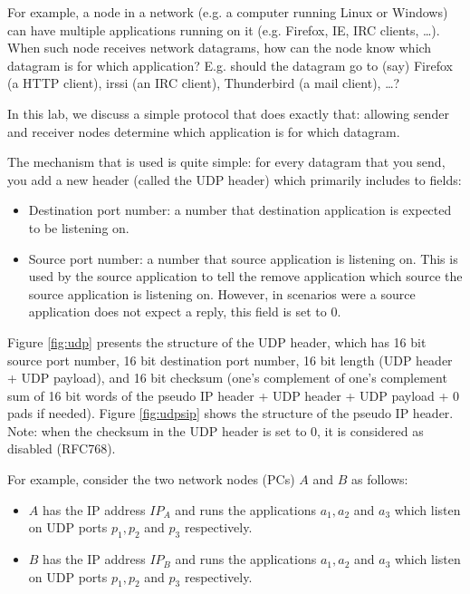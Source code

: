 \documentclass[pdftex,12pt,a4paper]{article}
\begin{document}
        For example, a node in a network (e.g. a computer running Linux or
        Windows) can have multiple applications running on it (e.g. Firefox,
        IE, IRC clients, \ldots). When such node receives network datagrams,
        how can the node know which datagram is for which application? E.g.
        should the datagram go to (say) Firefox (a HTTP client), irssi (an IRC client), Thunderbird
        (a mail client), \ldots?

        In this lab, we discuss a simple protocol that does exactly that:
        allowing sender and receiver nodes determine which application is for
        which datagram.

        The mechanism that is used is quite simple: for every datagram that you
        send, you add a new header (called the UDP header) which primarily
        includes to fields:
        \begin{itemize}
            \item Destination port number: a number that destination
                application is expected to be listening on. 
            \item Source port number: a number that source 
                application is listening on. This is used by the source
                application to tell the remove application which source the
                source application is listening on. However, in scenarios were a
                source application does not expect a reply, this field is set
                to 0.
        \end{itemize}

        Figure \ref{fig:udp} presents the structure of the UDP header, which
        has 16 bit source port number, 16 bit destination port number, 16 bit
        length (UDP header + UDP payload), and 16 bit checksum (one's
        complement of one's complement sum of 16 bit words of the pseudo IP
        header + UDP header + UDP payload + 0 pads if needed). Figure
        \ref{fig:udpsip} shows the structure of the pseudo IP header. Note:
        when the checksum in the UDP header is set to 0, it is considered as
        disabled (RFC768).

        For example, consider the two network nodes (PCs) $A$ and $B$ as
        follows:
        \begin{itemize}
            \item $A$ has the IP address $IP_A$ and runs the
                applications $a_{1}, a_{2}$ and $a_{3}$ which listen
                on UDP ports $p_1, p_2$ and $p_3$ respectively.
            \item $B$ has the IP address $IP_B$ and runs the
                applications $a_{1}, a_{2}$ and $a_{3}$ which listen
                on UDP ports $p_1, p_2$ and $p_3$ respectively.
        \end{itemize}
\end{document}
